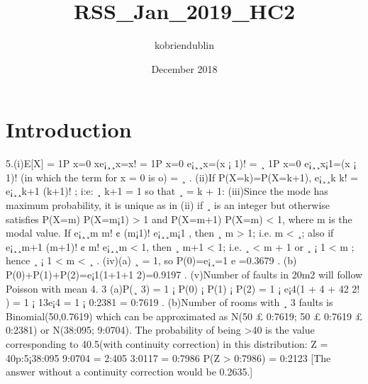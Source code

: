\documentclass{article}
\title{RSS_Jan_2019_HC2}
\author{kobriendublin }
\date{December 2018}
\begin{document}
\maketitle

\section{Introduction}

5.(i)E[X] =
1P
x=0
xe¡¸¸x=x!
=
1P
x=0
e¡¸¸x=(x ¡ 1)!
= ¸
1P
x=0
e¡¸¸x¡1=(x ¡ 1)! (in which the term for x = 0 is o)
= ¸
.
(ii)If P(X=k)=P(X=k+1), e¡¸¸k
k! = e¡¸¸k+1
(k+1)! ; i:e: ¸
k+1 = 1 so that ¸ = k + 1:
(iii)Since the mode has maximum probability, it is unique as in (ii) if ¸ is an integer but otherwise
satisfies P(X=m)
P(X=m¡1) > 1 and P(X=m+1)
P(X=m) < 1, where m is the modal value.
If e¡¸¸m
m! ¢ (m¡1)!
e¡¸¸m¡1 , then ¸
m > 1; i.e. m < ¸;
also if e¡¸¸m+1
(m+1)! ¢ m!
e¡¸¸m < 1, then ¸
m+1 < 1; i.e. ¸ < m + 1 or ¸ ¡ 1 < m ;
hence ¸ ¡ 1 < m < ¸ .
(iv)(a) ¸ = 1, so P(0)=e¡¸=1
e =0.3679 .
(b) P(0)+P(1)+P(2)=e¡1(1+1+1
2)=0.9197 .
(v)Number of faults in 20m2 will follow Poisson with mean 4.
3
(a)P(¸ 3) = 1 ¡ P(0) ¡ P(1) ¡ P(2)
= 1 ¡ e¡4(1 + 4 + 42
2! )
= 1 ¡ 13e¡4
= 1 ¡ 0:2381 = 0:7619
.
(b)Number of rooms with ¸ 3 faults is Binomial(50,0.7619) which can be approximated as
N(50 £ 0:7619; 50 £ 0:7619 £ 0:2381) or N(38:095; 9:0704). The probability of being >40 is the
value corresponding to 40.5(with continuity correction) in this distribution:
Z = 40p:5¡38:095
9:0704
= 2:405
3:0117 = 0:7986
P(Z > 0:7986) = 0:2123
[The answer without a continuity correction would be 0.2635.]
\end{document}
